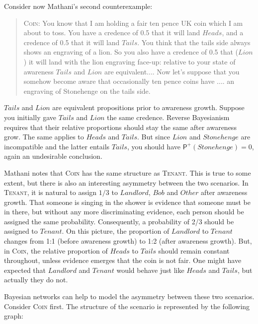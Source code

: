 \documentclass[
  11pt,
  dvipsnames,enabledeprecatedfontcommands]{scrartcl}
\newcommand{\ppr}[2]{\ensuremath{\mathsf{P}^{#1}(#2)}}
\begin{document}
Consider now Mathani's second counterexample:

\begin{quote} 
\textsc{Coin}: You know that I am holding a fair ten pence UK coin which I am about to toss. You
have a credence of 0.5 that it will land $Heads$, and a credence of 0.5 that it will
land $Tails$. You think that the tails side always shows an engraving of a lion. So you
also  have a credence of 0.5 that ($Lion$) it will land with the lion engraving face-up: relative to your state of awareness $Tails$ and $Lion$ are equivalent.... Now let's suppose that you somehow become aware
that occasionally ten pence coins have .... an engraving of Stonehenge on the tails side. 
\end{quote}

\doublespace

\noindent  \(Tails\) and \(Lion\) are equivalent propositions prior to
awareness growth. Suppose you initially gave \(Tails\) and \(Lion\) the
same credence. Reverse Bayesianism requires that their relative
proportions should stay the same after awareness grow. The same applies
to \(Heads\) and \(Tails\). But since \(Lion\) and \(Stonehenge\) are
incompatible and the latter entails \(Tails\), you should have
\(\ppr{+}{Stonehenge} = 0\), again an undesirable conclusion.

Mathani notes that \textsc{Coin} has the same structure as
\textsc{Tenant}. This is true to some extent, but there is also an
interesting asymmetry between the two scenarios. In \textsc{Tenant}, it
is natural to assign \(1/3\) to \(Landlord\), \(Bob\) and \(Other\)
after awareness growth. That someone is singing in the shower is
evidence that someone must be in there, but without any more
discriminating evidence, each person should be assigned the same
probability. Consequently, a probability of 2/3 should be assigned to
\(Tenant\). On this picture, the proportion of \(Landlord\) to
\(Tenant\) changes from 1:1 (before awareness growth) to 1:2 (after
awareness growth). But, in \textsc{Coin}, the relative proportion of
\(Heads\) to \(Tails\) should remain constant throughout, unless
evidence emerges that the coin is not fair. One might have expected that
\(Landlord\) and \(Tenant\) would behave just like \(Heads\) and
\(Tails\), but actually they do not.

Bayesian networks can help to model the asymmetry between these two
scenarios. Consider \textsc{Coin} first. The structure of the scenario
is represented by the following graph:
\end{document}
